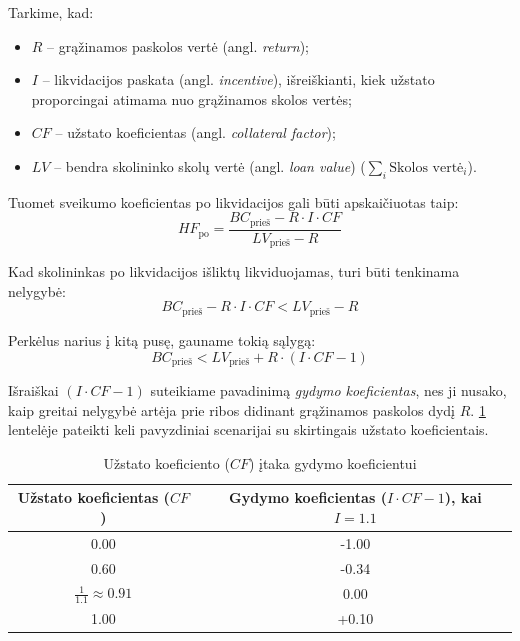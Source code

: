 \documentclass[]{VUMIFTemplateClass}
\begin{document}
Tarkime, kad:
\begin{itemize}
    \item $R$ – grąžinamos paskolos vertė (angl. \textit{return});
    \item $I$ – likvidacijos paskata (angl. \textit{incentive}), išreiškianti, kiek užstato proporcingai atimama nuo grąžinamos skolos vertės;
    \item $CF$ – užstato koeficientas (angl. \textit{collateral factor});
    \item $LV$ – bendra skolininko skolų vertė (angl. \textit{loan value}) ($\sum_{i} \text{Skolos vertė}_{i}$).
\end{itemize}

Tuomet sveikumo koeficientas po likvidacijos gali būti apskaičiuotas taip:
\begin{equation}
    HF_{\text{po}} = \frac{BC_{\text{prieš}} - R \cdot I \cdot CF}{LV_{\text{prieš}} - R}
    \label{eq:health_factor_delta}
\end{equation}

Kad skolininkas po likvidacijos išliktų likviduojamas, turi būti tenkinama nelygybė:
\begin{equation}
    {BC_{\text{prieš}} - R \cdot I \cdot CF} < {LV_{\text{prieš}} - R}
    \label{eq:nesveikumo_inequalinty}
\end{equation}

Perkėlus narius į kitą pusę, gauname tokią sąlygą:
\begin{equation}
    BC_{\text{prieš}} < LV_{\text{prieš}} + R \cdot (I \cdot CF - 1)
    \label{eq:nesveikumo_inequalinty_2}
\end{equation}

Išraiškai $(I \cdot CF - 1)$ suteikiame pavadinimą \textit{gydymo koeficientas}, nes ji nusako, kaip greitai nelygybė artėja prie ribos didinant grąžinamos paskolos dydį $R$. \ref{tab:cf_scenarijai} lentelėje pateikti keli pavyzdiniai scenarijai su skirtingais užstato koeficientais.

\begin{table}[H]
    \centering
    \caption{Užstato koeficiento ($CF$) įtaka gydymo koeficientui}
    \begin{tabular}{|c|c|}
        \hline
        \textbf{Užstato koeficientas ($CF$)} & \textbf{Gydymo koeficientas ($I \cdot CF - 1$), kai $I=1.1$} \\
        \hline
        0.00 & -1.00 \\
        0.60 & -0.34 \\
        $\frac{1}{1.1} \approx 0.91$ & 0.00 \\
        1.00 & +0.10 \\
        \hline
    \end{tabular}
    \label{tab:cf_scenarijai}
\end{table}
\end{document}
